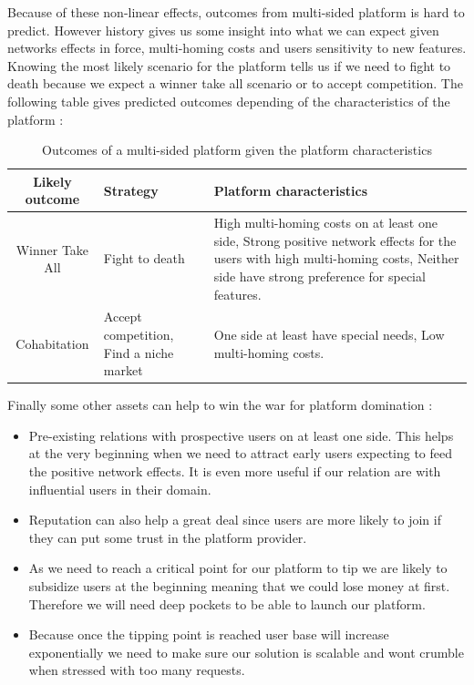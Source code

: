 \documentclass[10pt]{report}
\begin{document}
Because of these non-linear effects, outcomes from multi-sided platform is hard to predict. However history gives us some insight into what we can expect given networks effects in force, multi-homing costs and users sensitivity to new features. Knowing the most likely scenario for the platform tells us if we need to fight to death because we expect a winner take all scenario or to accept competition. The following table gives predicted outcomes depending of the characteristics of the platform :

\begin{table}[!ht]
\begin{center}
\begin{tabularx}{\textwidth}{cp{3.5cm}X}
\hline
Likely outcome & Strategy & Platform characteristics \tabularnewline
\hline
\hline
Winner Take All & Fight to death & High multi-homing costs on at least one side, Strong positive network effects for the users with high multi-homing costs, Neither side have strong preference for special features.\\
\hline
Cohabitation & Accept competition, Find a niche market & One side at least have special needs, Low multi-homing costs.\\
\hline
\end{tabularx}
\end{center}
\caption{Outcomes of a multi-sided platform given the platform characteristics}
\end{table}


Finally some other assets can help to win the war for platform domination \autocite{eisenmann2006strategies} :
\begin{itemize}
\item Pre-existing relations with prospective users on at least one side. This helps at the very beginning when we need to attract early users expecting to feed the positive network effects. It is even more useful if our relation are with influential users in their domain.
\item Reputation can also help a great deal since users are more likely to join if they can put some trust in the platform provider.
\item As we need to reach a critical point for our platform to tip we are likely to subsidize users at the beginning meaning that we could lose money at first. Therefore we will need deep pockets to be able to launch our platform.
\item Because once the tipping point is reached user base will increase exponentially we need to make sure our solution is scalable and wont crumble when stressed with too many requests.
\end{itemize}
\end{document}
